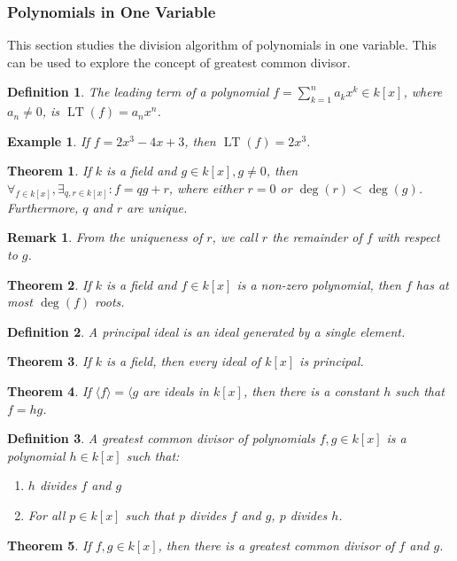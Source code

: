 \documentclass[oneside]{book}
\theoremstyle{mystyle}
\newtheorem{theorem}{Theorem}[section]
\newtheorem{definition}{Definition}[section]
\newtheorem{example}{Example}[section]
\newtheorem{remark}{Remark}[section]
\DeclareMathOperator{\LT}{LT}
\begin{document}
\subsubsection{Polynomials in One Variable}
This section studies the division algorithm of polynomials in one variable. This can be used to explore the concept of greatest common divisor.
\begin{definition}
The leading term of a polynomial $f = \sum_{k=1}^{n} a_kx^k \in k[x]$, where $a_n \ne 0$, is $\LT(f)=a_nx^n$.
\end{definition}
\begin{example}
If $f = 2x^3-4x+3$, then $\LT(f) = 2x^3$.
\end{example}
\begin{theorem}
If $k$ is a field and $g\in k[x],g\ne 0$, then $\forall_{f\in k[x]}, \exists_{q,r\in k[x]}: f = qg+r$, where either $r=0$ or $\deg(r)<\deg(g)$. Furthermore, $q$ and $r$ are unique.
\end{theorem}
\begin{remark}
From the uniqueness of $r$, we call $r$ the remainder of $f$ with respect to $g$.
\end{remark}
\begin{theorem}
If $k$ is a field and $f\in k[x]$ is a non-zero polynomial, then $f$ has at most $\deg(f)$ roots.
\end{theorem}
\begin{definition}
A principal ideal is an ideal generated by a single element.
\end{definition}
\begin{theorem}
If $k$ is a field, then every ideal of $k[x]$ is principal.
\end{theorem}
\begin{theorem}
If $\langle f \rangle = \langle g$ are ideals in $k[x]$, then there is a constant $h$ such that $f=hg$.
\end{theorem}
\begin{definition}
A greatest common divisor of polynomials $f,g\in k[x]$ is a polynomial $h\in k[x]$ such that:
\begin{enumerate}
    \item $h$ divides $f$ and $g$
    \item For all $p\in k[x]$ such that $p$ divides $f$ and $g$, $p$ divides $h$.
\end{enumerate}
\end{definition}
\begin{theorem}
If $f,g\in k[x]$, then there is a greatest common divisor of $f$ and $g$.
\end{theorem}
\end{document}
